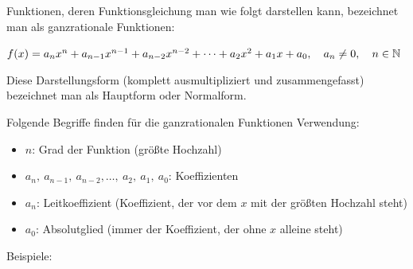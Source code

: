 Funktionen, deren Funktionsgleichung man wie folgt darstellen kann, bezeichnet man als ganzrationale Funktionen:

\(f(x)=a_nx^n+a_{n-1}x^{n-1}+a_{n-2}x^{n-2}+\dots +a_2x^2+a_1x+a_0, \quad a_n\neq 0, \quad n\in\mathbb{N}\)

Diese Darstellungsform (komplett ausmultipliziert und zusammengefasst) bezeichnet man als Hauptform oder Normalform.

Folgende Begriffe finden für die ganzrationalen Funktionen Verwendung:
\begin{itemize}\large
	\item[\textcolor{loes}{\textbullet}] \textcolor{loes}{\(n\): Grad der Funktion (größte Hochzahl)}
	\item[\textcolor{loes}{\textbullet}]  \textcolor{loes}{\(a_n,\ a_{n-1},\ a_{n-2}, \dots,\ a_2,\ a_1,\ a_0\): Koeffizienten}
	\item[\textcolor{loes}{\textbullet}]  \textcolor{loes}{\(a_n\): Leitkoeffizient (Koeffizient, der vor dem \(x\) mit der größten Hochzahl steht)}
	\item[\textcolor{loes}{\textbullet}]  \textcolor{loes}{\(a_0\): Absolutglied (immer der Koeffizient, der ohne \(x\) alleine steht)}
\end{itemize}\vspace{2cm}
Beispiele:

\medskip

